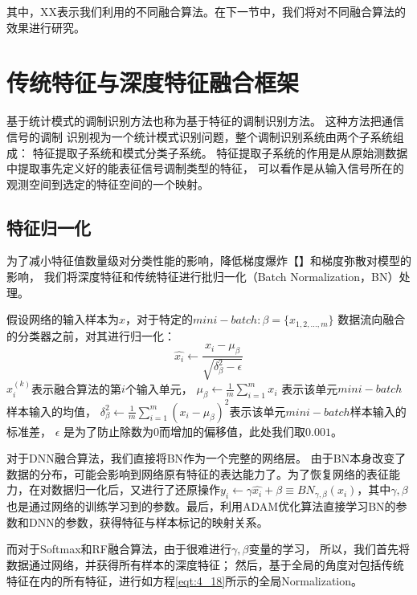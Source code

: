 其中，XX表示我们利用的不同融合算法。在下一节中，我们将对不同融合算法的效果进行研究。


\section{传统特征与深度特征融合框架}

基于统计模式的调制识别方法也称为基于特征的调制识别方法。
这种方法把通信信号的调制
识别视为一个统计模式识别问题，整个调制识别系统由两个子系统组成：
特征提取子系统和模式分类子系统。
特征提取子系统的作用是从原始测数据中提取事先定义好的能表征信号调制类型的特征，
可以看作是从输入信号所在的观测空间到选定的特征空间的一个映射。\par

\subsection{特征归一化}
\label{sec:feature_normalization}
为了减小特征值数量级对分类性能的影响，降低梯度爆炸【】和梯度弥散对模型的影响，
我们将深度特征和传统特征进行批归一化（Batch Normalization，BN）处理。\par

假设网络的输入样本为$x$，对于特定的$mini-batch: \beta=\{x_{1,2,...,m}\}$
数据流向融合的分类器之前，对其进行归一化：
\begin{equation}
	\label{eqt:4_18}
	\hat{x_i} \leftarrow \frac{x_i - \mu_\beta}{\sqrt{\delta_\beta^2 - \epsilon}}
\end{equation}
$x_i^{(k)}$表示融合算法的第$i$个输入单元，
$\mu_\beta \leftarrow \frac{1}{m}\sum_{i=1}^{m} x_i$ 表示该单元$mini-batch$样本输入的均值，
$	\delta_\beta^2 \leftarrow \frac{1}{m}\sum_{i=1}^{m}(x_i - \mu_\beta)^2$表示该单元$mini-batch$样本输入的标准差，
$\epsilon$ 是为了防止除数为$0$而增加的偏移值，此处我们取$0.001$。\par

对于DNN融合算法，我们直接将BN作为一个完整的网络层。
由于BN本身改变了数据的分布，可能会影响到网络原有特征的表达能力了。为了恢复网络的表征能力，在对数据归一化后，又进行了还原操作$y_i \leftarrow \gamma \hat{x_i} + \beta \equiv BN_{\gamma, \beta}(x_i)$，其中$\gamma, \beta$也是通过网络的训练学习到的参数。最后，利用ADAM优化算法直接学习BN的参数和DNN的参数，获得特征与样本标记的映射关系。\par

而对于Softmax和RF融合算法，由于很难进行$\gamma, \beta$变量的学习，
所以，我们首先将数据通过网络，并获得所有样本的深度特征；
然后，基于全局的角度对包括传统特征在内的所有特征，进行如方程\eqref{eqt:4_18}所示的全局Normalization。\par

